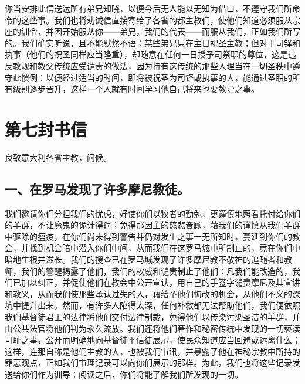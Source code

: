 你当安排此信送达所有弟兄知晓，以便今后无人能以无知为借口，不遵守我们所命令的这些事。我们也将劝诫信直接寄给了各省的都主教们，使他们知道必须服从宗座的训令，并因开始服从你——弟兄，我们的代表——而服从我们，正如我们所写的。我们确实听说，且不能默然不语：某些弟兄只在主日祝圣主教；但对于司铎和执事（他们的祝圣同样应当隆重），却随意在任何一日授予司祭职的尊位，这是违反教规和教父传统应受谴责的做法，因为持有这传统的那些人理当在一切圣秩中遵守此惯例：以便经过适当的时间，即将被祝圣为司铎或执事的人，能通过圣职的所有级别逐步晋升，这样一个人就有时间学习他自己将来也要教导之事。\par



\section{第七封书信}

良致意大利各省主教，问候。\par


\subsection{一、在罗马发现了许多摩尼教徒。}

我们邀请你们分担我们的忧虑，好使你们以牧者的勤勉，更谨慎地照看托付给你们的羊群，不让魔鬼的诡计得逞；免得那因主的慈悲眷顾，藉我们的谨慎从我们羊群中驱除的瘟疫，在你们尚未得到警告并仍对发生之事一无所知时，蔓延到你们的教会，并找到机会暗中潜入你们中间，从而我们在这罗马城中所制止的，竟在你们中暗地生根并滋长。我们的搜查已在罗马城发现了许多摩尼教不敬神的追随者和教师，我们的警醒揭露了他们，我们的权威和谴责制止了他们：凡我们能改造的，我们已加以纠正，并促使他们在教会中公开宣认，用自己的手签字谴责摩尼及其宣讲和教义，从而我们使那些承认过失的人，藉给予他们悔改的机会，从他们不义的深坑中提升出来。然而，有许多人陷得太深，任何补救都无法帮助他们，我们便依照我们基督徒君王的法律将他们交付法律制裁，免得他们以传染污染圣洁的羊群，并由公共法官将他们判为永久流放。我们还将他们著作和秘密传统中发现的一切亵渎可耻之事，公开而明确地向基督徒平信徒展示，使民众知道应当回避或远离什么；这样，连那自称是他们主教的人，也被我们审讯，并暴露了他在神秘宗教中所持的罪恶观点，正如我们审理记录可以向你们展示的那样。为此，我们也将这些记录发送给你们作为训导：阅读之后，你们将能了解我们所发现的一切。\par

